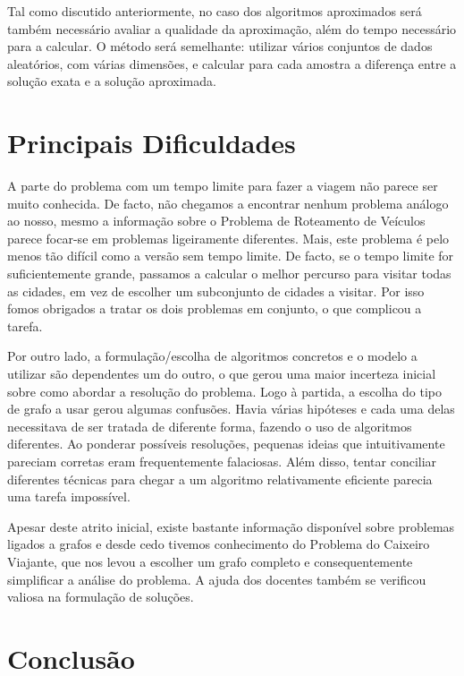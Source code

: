 \documentclass[12pt,a4paper,reqno]{report}
\numberwithin{figure}{section}
\numberwithin{equation}{section}
\numberwithin{figure}{section}
\numberwithin{equation}{section}
\begin{document}
Tal como discutido anteriormente, no caso dos algoritmos aproximados será também necessário avaliar a qualidade da aproximação, além do tempo necessário para a calcular. O método será semelhante: utilizar vários conjuntos de dados aleatórios, com várias dimensões, e calcular para cada amostra a diferença entre a solução exata e a solução aproximada.

\chapter{Principais Dificuldades}

A parte do problema com um tempo limite para fazer a viagem não parece ser muito conhecida. De facto, não chegamos a encontrar nenhum problema análogo ao nosso, mesmo a informação sobre o Problema de Roteamento de Veículos parece focar-se em problemas ligeiramente diferentes. Mais, este problema é pelo menos tão difícil como a versão sem tempo limite. De facto, se o tempo limite for suficientemente grande, passamos a calcular o melhor percurso para visitar todas as cidades, em vez de escolher um subconjunto de cidades a visitar. Por isso fomos obrigados a tratar os dois problemas em conjunto, o que complicou a tarefa.

Por outro lado, a formulação/escolha de algoritmos concretos e o modelo a utilizar são dependentes um do outro, o que gerou uma maior incerteza inicial sobre como abordar a resolução do problema. Logo à partida, a escolha do tipo de grafo a usar gerou algumas confusões. Havia várias hipóteses e cada uma delas necessitava de ser tratada de diferente forma, fazendo o uso de algoritmos diferentes. Ao ponderar possíveis resoluções, pequenas ideias que intuitivamente pareciam corretas eram frequentemente falaciosas. Além disso, tentar conciliar diferentes técnicas para chegar a um algoritmo relativamente eficiente parecia uma tarefa impossível.

Apesar deste atrito inicial, existe bastante informação disponível sobre problemas ligados a grafos e desde cedo tivemos conhecimento do Problema do Caixeiro Viajante, que nos levou a escolher um grafo completo e consequentemente simplificar a análise do problema. A ajuda dos docentes também se verificou valiosa na formulação de soluções.

\chapter{Conclusão}
\end{document}
